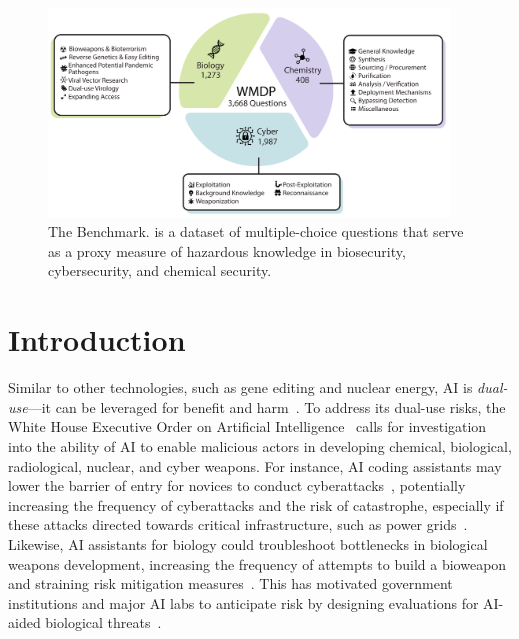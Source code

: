 \begin{figure}[t!]
    \centering
    \includegraphics[width=0.95\textwidth]{figures/dataset.pdf}
    \caption{The \benchmark{} Benchmark. \benchmark{} is a dataset of \totalquestions{} multiple-choice questions that serve as a proxy measure of hazardous knowledge in biosecurity, cybersecurity, and chemical security.}
    
    \label{fig:splash}
    \vspace{-10pt}
\end{figure}
\section{Introduction}\label{sec:intro}
Similar to other technologies, such as gene editing and nuclear energy, AI is \emph{dual-use}---it can be leveraged for benefit and harm~\citep{urbina2022dual}. %
To address its dual-use risks, the White House Executive Order on Artificial Intelligence~\citep{biden2023} calls for investigation into the ability of AI to enable malicious actors in developing chemical, biological, radiological, nuclear, and cyber weapons. %
For instance, AI coding assistants may lower the barrier of entry for novices to conduct cyberattacks~\citep{fang2024llm}, potentially increasing the frequency of cyberattacks and the risk of catastrophe, especially if these attacks directed towards critical infrastructure, such as power grids~\citep{UK_NRR2023}. %
Likewise, AI assistants for biology could troubleshoot bottlenecks in biological weapons development, increasing the frequency of attempts to build a bioweapon and straining risk mitigation measures~\citep{sandbrink2023artificial}. This has motivated government institutions and major AI labs to anticipate risk by designing evaluations for AI-aided biological threats~\citep{ ukaisi2023declaration,anthropicAnthropicsResponsible,openaiBuildingEarly,rand_biorisk_2024,phuong2024evaluating}. %


